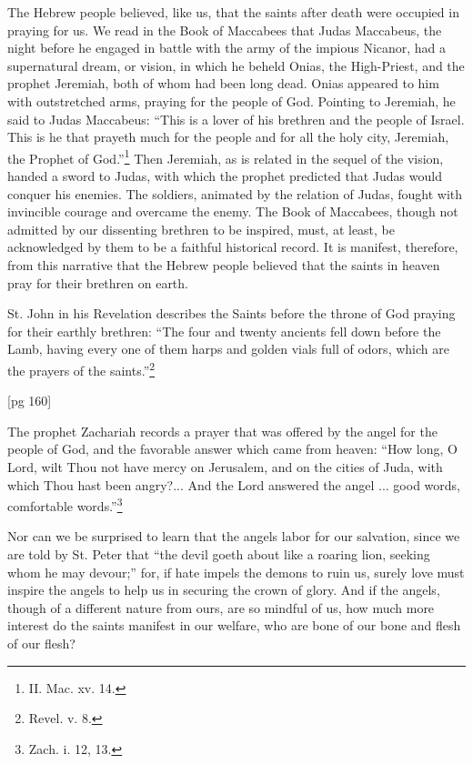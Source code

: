 The Hebrew people believed, like us, that the
saints after death were occupied in praying for us.
We read in the Book of Maccabees that Judas
Maccabeus, the night before he engaged in battle
with the army of the impious Nicanor, had a
supernatural dream, or vision, in which he beheld
Onias, the High-Priest, and the prophet Jeremiah,
both of whom had been long dead. Onias appeared
to him with outstretched arms, praying for
the people of God. Pointing to Jeremiah, he said
to Judas Maccabeus: “This is a lover of his
brethren and the people of Israel. This is he that
prayeth much for the people and for all the holy
city, Jeremiah, the Prophet of
God.”\footnote{II. Mac. xv. 14.} Then
Jeremiah, as is related in the sequel of the vision,
handed a sword to Judas, with which the prophet
predicted that Judas would conquer his enemies.
The soldiers, animated by the relation of Judas,
fought with invincible courage and overcame the
enemy. The Book of Maccabees, though not admitted
by our dissenting brethren to be inspired,
must, at least, be acknowledged by them to be a
faithful historical record. It is manifest, therefore,
from this narrative that the Hebrew people
believed that the saints in heaven pray for their
brethren on earth.

St. John in his Revelation describes the Saints
before the throne of God praying for their earthly
brethren: “The four and twenty ancients fell down
before the Lamb, having every one of them harps
and golden vials full of odors, which are the prayers
of the saints.”\footnote{Revel. v. 8.}

[pg 160]

The prophet Zachariah records a prayer that
was offered by the angel for the people of God,
and the favorable answer which came from heaven:
“How long, O Lord, wilt Thou not have mercy on
Jerusalem, and on the cities of Juda, with which
Thou hast been angry?... And the Lord answered
the angel ... good words, comfortable
words.”\footnote{Zach. i. 12, 13.}

Nor can we be surprised to learn that the angels
labor for our salvation, since we are told by St.
Peter that “the devil goeth about like a roaring
lion, seeking whom he may devour;” for, if hate
impels the demons to ruin us, surely love must
inspire the angels to help us in securing the crown
of glory. And if the angels, though of a different
nature from ours, are so mindful of us, how much
more interest do the saints manifest in our welfare,
who are bone of our bone and flesh of our
flesh?

